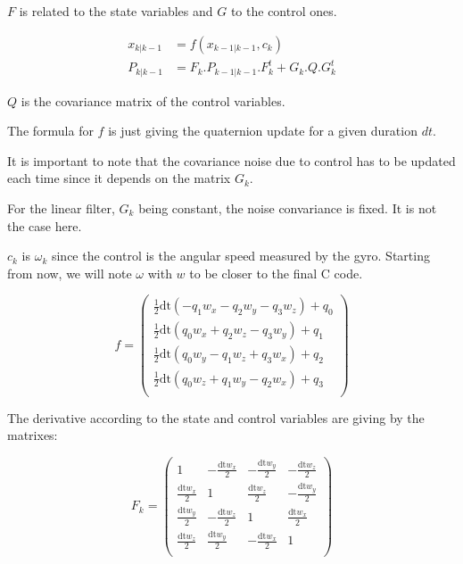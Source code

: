 \documentclass[titlepage,a4,12pt]{article}
\numberwithin{equation}{subsection}
\newcommand{\curr}[1]{#1_{k-1|k-1}}
\newcommand{\before}[1]{#1_{k|k-1}}
\begin{document}
$F$ is related to the state variables and $G$ to the control ones.

\begin{align}\label{eq:predict}
\before{x} &= f(\curr{x},c_k)\\
\before{P} &= F_k . \curr{P} . F_k^t + G_k . Q . G_k^t
\end{align}

$Q$ is the covariance matrix of the control variables.

The formula for $f$ is just giving the quaternion update for a given duration $dt$.

It is important to note that the covariance noise due to control has to be updated each time since it depends on the matrix $G_k$.

For the linear filter, $G_k$ being constant, the noise convariance is fixed. It is not the case here.

$c_k$ is $\omega_k$ since the control is the angular speed measured by the gyro. Starting from now, we will note $\omega$ with $w$ to be closer to the final C code.

\begin{equation}\label{eq:f}
f = \left(
\begin{array}{c}
 \frac{1}{2} \text{dt} (-q_1 {w_x}-q_2 {w_y}-q_3 {w_z})+q_0 \\
 \frac{1}{2} \text{dt} (q_0 {w_x}+q_2 {w_z}-q_3 {w_y})+q_1 \\
 \frac{1}{2} \text{dt} (q_0 {w_y}-q_1 {w_z}+q_3 {w_x})+q_2 \\
 \frac{1}{2} \text{dt} (q_0 {w_z}+q_1 {w_y}-q_2 {w_x})+q_3 \\
\end{array}
\right)
\end{equation}

The derivative according to the state and control variables are giving by the matrixes:

\begin{equation}\label{eq:Fmatrix}
F_k = \left(
\begin{array}{cccc}
 1 & -\frac{\text{dt} {w_x}}{2} & -\frac{\text{dt} {w_y}}{2} & -\frac{\text{dt} {w_z}}{2} \\
 \frac{\text{dt} {w_x}}{2} & 1 & \frac{\text{dt} {w_z}}{2} & -\frac{\text{dt} {w_y}}{2} \\
 \frac{\text{dt} {w_y}}{2} & -\frac{\text{dt} {w_z}}{2} & 1 & \frac{\text{dt} {w_x}}{2} \\
 \frac{\text{dt} {w_z}}{2} & \frac{\text{dt} {w_y}}{2} & -\frac{\text{dt} {w_x}}{2} & 1 \\
\end{array}
\right)
\end{equation}
\end{document}
